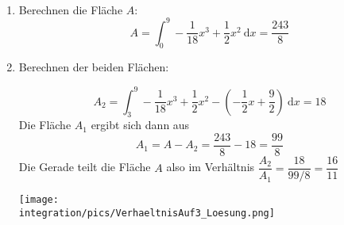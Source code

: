 \documentclass[a4paper,12pt, headsepline, ngerman]{scrartcl}
\theoremstyle{definition}
\newcommand{\td}{\ \text{d}}
\newcommand{\fakesubsection}[1]{%
	\par\refstepcounter{subsection}%
	\subsectionmark{#1}%
	\addcontentsline{toc}{subsection}{\protect\numberline{\thesubsection}#1}%
}
\begin{document}
\begin{Answer}[ref=verhaltnisFlaechenA3]\\
	\begin{enumerate}[label=\alph*)]
		\item Berechnen die Fläche \(A\):
		\[A=\int_0^9 -\frac{1}{18}x^3+\frac{1}{2}x^2 \td x=\frac{243}{8}\]
		\item Berechnen der beiden Flächen:\\
		\begin{minipage}{\textwidth}
			\begin{minipage}{.5\textwidth}\raggedright
				\[A_2=\int_3^9 -\frac{1}{18}x^3+\frac{1}{2}x^2-\left(-\frac{1}{2}x+\frac{9}{2}\right) \td x=18\]
				Die Fläche \(A_1\) ergibt sich dann aus
				\[A_1=A-A_2=\frac{243}{8}-18=\frac{99}{8}\]
				Die Gerade teilt die Fläche \(A\) also im Verhältnis \(\dfrac{A_2}{A_1}=\dfrac{18}{99/8}=\dfrac{16}{11}\)
			\end{minipage}
			\begin{minipage}{.5\textwidth}
				\texttt{[image: \\integration/pics/VerhaeltnisAuf3\_Loesung.png]}
			\end{minipage}
		\end{minipage}	
	\end{enumerate}
\end{Answer}
\end{document}
